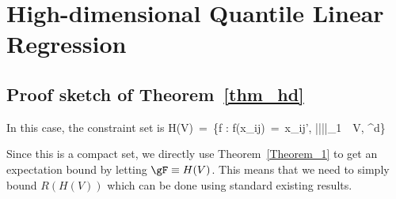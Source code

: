 \documentclass[twoside,11pt]{article}
\begin{document}




\section{High-dimensional Quantile Linear Regression}
% 

\subsection{Proof sketch of Theorem~\ref{thm_hd}}
In this case, the constraint set is
\bea
H(V) \,=\, \{f : f(x_{ij}) \,=\, x_{ij}'\beta, ||\beta||_1 \,\leq\, V, \beta \in {}^d\} 
\bea

Since this is a compact set, we directly use Theorem~\ref{Theorem_1} to get an expectation bound by letting $\gF \equiv H(V)$. This means that we need to simply bound $ R(H(V)) $ which can be done using standard existing results.
\end{document}
